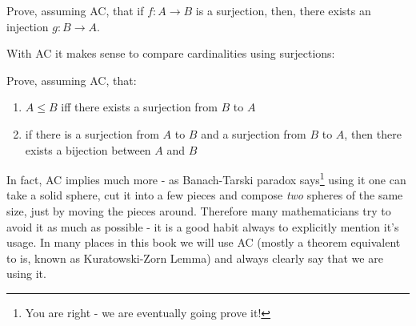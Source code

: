 \begin{exercise}
  Prove, assuming AC, that if $f:A\to B$ is a surjection, then, there exists an injection $g: B\to A$.
\end{exercise}

With AC it makes sense to compare cardinalities using surjections:

\begin{exercise}
  Prove, assuming AC, that:
  \begin{enumerate}
    \item $A\le B$ iff there exists a surjection from $B$ to $A$
    \item if there is a surjection from $A$ to $B$ and a surjection from $B$ to $A$, then there exists a bijection between $A$ and $B$
  \end{enumerate}
\end{exercise}


In fact, AC implies much more - as Banach-Tarski paradox says\footnote{You are right - we are eventually going prove it!} using it one can take a solid sphere, cut it into a few pieces and compose \emph{two}
spheres of the same size, just by moving the pieces around. Therefore many mathematicians try to avoid it as much as possible - it is a good habit always to explicitly mention it's usage. In many places in this book
we will use AC (mostly a theorem equivalent to is, known as Kuratowski-Zorn Lemma) and always clearly say that we are using it.





